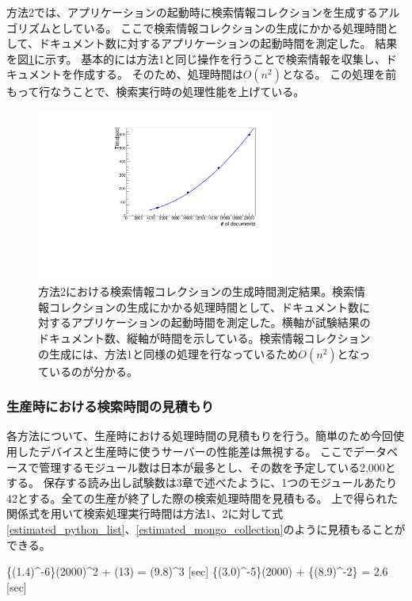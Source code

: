 方法2では、アプリケーションの起動時に検索情報コレクションを生成するアルゴリズムとしている。
ここで検索情報コレクションの生成にかかる処理時間として、ドキュメント数に対するアプリケーションの起動時間を測定した。
結果を図\ref{creating_cache_time}に示す。
基本的には方法1と同じ操作を行うことで検索情報を収集し、ドキュメントを作成する。
そのため、処理時間は$O(n^2)$となる。
この処理を前もって行なうことで、検索実行時の処理性能を上げている。
\begin{figure}[bpt]
  \begin{center}
  \includegraphics[width=8cm,angle=270]{creating_cache_time.pdf}
  \caption[方法2における検索情報コレクションの生成時間測定結果]{方法2における検索情報コレクションの生成時間測定結果。検索情報コレクションの生成にかかる処理時間として、ドキュメント数に対するアプリケーションの起動時間を測定した。横軸が試験結果のドキュメント数、縦軸が時間を示している。検索情報コレクションの生成には、方法1と同様の処理を行なっているため$O(n^2)$となっているのが分かる。}
  \label{creating_cache_time}
  \end{center}
\end{figure}

\subsubsection{生産時における検索時間の見積もり}
各方法について、生産時における処理時間の見積もりを行う。簡単のため今回使用したデバイスと生産時に使うサーバーの性能差は無視する。
ここでデータベースで管理するモジュール数は日本が最多とし、その数を予定している2,000とする。
保存する読み出し試験数は3章で述べたように、1つのモジュールあたり42とする。全ての生産が終了した際の検索処理時間を見積もる。
上で得られた関係式を用いて検索処理実行時間は方法1、2に対して式\ref{estimated_python_list}、\ref{estimated_mongo_collection}のように見積もることができる。

\bbb
\{(1.4)^{-6}\}\times(2000)^2 + (13) = (9.8)^{3} [\rm{sec}]
\label{estimated_python_list}
\eee
\bbb
\{(3.0)^{-5}\}\times(2000) + \{(8.9)^{-2}\} = 2.6 [\rm{sec}]
\label{estimated_mongo_collection}
\eee

